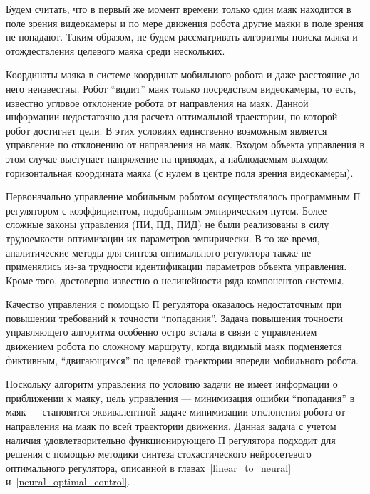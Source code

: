 Будем считать, что в первый же момент времени только один маяк
находится в поле зрения видеокамеры и по мере движения робота другие
маяки в поле зрения не попадают.  Таким образом, не будем
рассматривать алгоритмы поиска маяка и отождествления целевого маяка
среди нескольких.

Координаты маяка в системе координат мобильного робота и даже
расстояние до него неизвестны.  Робот ``видит'' маяк только
посредством видеокамеры, то есть, известно угловое отклонение робота
от направления на маяк.  Данной информации недостаточно для расчета
оптимальной траектории, по которой робот достигнет цели.  В этих
условиях единственно возможным является управление по отклонению от
направления на маяк.  Входом объекта управления в этом случае
выступает напряжение на приводах, а наблюдаемым выходом ---
горизонтальная координата маяка (с нулем в центре поля зрения
видеокамеры).

Первоначально управление мобильным роботом осуществлялось программным
П ре\-гу\-ля\-то\-ром с коэффициентом, подобранным эмпирическим путем.
Более сложные законы управления (ПИ, ПД, ПИД) не были реализованы в
силу трудоемкости оптимизации их параметров эмпирически.  В то же
время, аналитические методы для синтеза оптимального регулятора также
не применялись из-за трудности идентификации параметров объекта
управления.  Кроме того, достоверно известно о нелинейности ряда
компонентов системы.

Качество управления с помощью П регулятора оказалось недостаточным при
повышении требований к точности ``попадания''.  Задача повышения
точности управляющего алгоритма особенно остро встала в связи с
управлением движением робота по сложному маршруту, когда видимый маяк
подменяется фиктивным, ``двигающимся'' по целевой траектории впереди
мобильного робота.

Поскольку алгоритм управления по условию задачи не имеет информации о
приближении к маяку, цель управления --- минимизация ошибки
``попадания'' в маяк --- становится эквивалентной задаче минимизации
отклонения робота от направления на маяк по всей траектории движения.
Данная задача с учетом наличия удовлетворительно функционирующего П
регулятора подходит для решения с помощью методики синтеза
стохастического нейросетевого оптимального регулятора, описанной в
главах~\ref{linear_to_neural} и~\ref{neural_optimal_control}.


